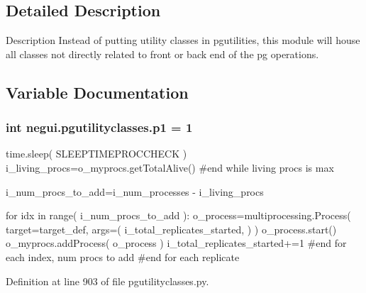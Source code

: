 \subsection{Detailed Description}
\begin{DoxyVerb}Description
Instead of putting utility classes in pgutilities,
this module will house all classes not directly related
to front or back end of the pg operations.
\end{DoxyVerb}
 

\subsection{Variable Documentation}
\subsubsection[{\texorpdfstring{p1}{p1}}]{\setlength{\rightskip}{0pt plus 5cm}int negui.\+pgutilityclasses.\+p1 = 1}\hypertarget{namespacenegui_1_1pgutilityclasses_af03bb9226272b714c1db572575aa8a71}{}\label{namespacenegui_1_1pgutilityclasses_af03bb9226272b714c1db572575aa8a71}


time.\+sleep( S\+L\+E\+E\+P\+T\+I\+M\+E\+P\+R\+O\+C\+C\+H\+E\+C\+K ) i\+\_\+living\+\_\+procs=o\+\_\+myprocs.\+get\+Total\+Alive() \#end while living procs is max 

i\+\_\+num\+\_\+procs\+\_\+to\+\_\+add=i\+\_\+num\+\_\+processes -\/ i\+\_\+living\+\_\+procs

for idx in range( i\+\_\+num\+\_\+procs\+\_\+to\+\_\+add )\+: o\+\_\+process=multiprocessing.\+Process( target=target\+\_\+def, args=( i\+\_\+total\+\_\+replicates\+\_\+started, ) ) o\+\_\+process.\+start() o\+\_\+myprocs.\+add\+Process( o\+\_\+process ) i\+\_\+total\+\_\+replicates\+\_\+started+=1 \#end for each index, num procs to add \#end for each replicate 

Definition at line 903 of file pgutilityclasses.\+py.

